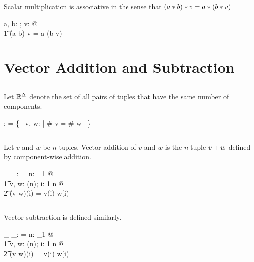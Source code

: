 \documentclass[11pt, oneside]{article}
\begin{document}
\begin{remark}
Scalar multiplication is associative in the sense that $(a \mathbin{*} b) \mathbin{*} v = a \mathbin{*} (b \mathbin{*} v)$

\begin{zed}
	\forall a, b: \R; v: \Rinf @ \\
	\t1	(a \mulR b) \smulR v = a \smulR (b \smulR v)
\end{zed}

\end{remark}

\section{Vector Addition and Subtraction}

\subsection{}

Let $\mathbb{R}^\Delta$ denote the set of all pairs of tuples that have the same number of components.

\begin{axdef}
	\Rdelta: \Rinf \rel \Rinf
\where
	\Rdelta = \{~ v, w: \Rinf | \# v = \# w ~\}
\end{axdef}

\subsection{}

Let $v$ and $w$ be $n$-tuples.
Vector addition of $v$ and $w$ is the $n$-tuple $v \mathbin{+} w$ defined by component-wise addition.

\begin{axdef}
	\_ \vaddR \_: \Rdelta \fun \Rinf
\where
	\langle \rangle \vaddR \langle \rangle = \langle \rangle
\also
	\forall n: \nat_1 @ \\
	\t1	\forall v, w: \Rtuples(n); i: 1 \upto n @ \\
	\t2		(v \vaddR w)(i) = v(i) \addR w(i)
\end{axdef}

\subsection{}

Vector subtraction is defined similarly.

\begin{axdef}
	\_ \vsubR \_: \Rdelta \fun \Rinf
\where
	\langle \rangle \vsubR \langle \rangle = \langle \rangle
\also
	\forall n: \nat_1 @ \\
	\t1	\forall v, w: \Rtuples(n); i: 1 \upto n @ \\
	\t2		(v \vsubR w)(i) = v(i) \subR w(i)
\end{axdef}
\end{document}
